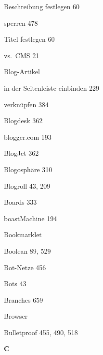 \documentclass{book}
\renewcommand\indexspace{\vspace{11pt}}
\renewcommand\subitem{\par}
\begin{document}
\begin{multicols}{2}
\begin{osp-index}
    \subitem Beschreibung festlegen\hspace{1mm} 60
    \subitem sperren\hspace{1mm} 478
    \subitem Titel festlegen\hspace{1mm} 60
    \subitem vs.\ CMS\hspace{1mm} 21
  \item Blog-Artikel
    \subitem in der Seitenleiste einbinden\hspace{1mm} 229
    \subitem verkn\"upfen\hspace{1mm} 384
  \item Blogdesk\hspace{1mm} 362
  \item blogger.com\hspace{1mm} 193
  \item BlogJet\hspace{1mm} 362
  \item Blogosph\"are\hspace{1mm} 310
  \item Blogroll\hspace{1mm} 43, 209
  \item Boards\hspace{1mm} 333
  \item boastMachine\hspace{1mm} 194
  \item Bookmarklet\hspace{1mm} 
  \item Boolean\hspace{1mm} 89, 529
  \item Bot-Netze\hspace{1mm} 456
  \item Bots\hspace{1mm} 43
  \item Branches\hspace{1mm} 659
  \item Browser\hspace{1mm} 
  \item Bulletproof\hspace{1mm} 455, 490, 518

  \indexspace
{\sffamily\bfseries C}\nopagebreak


\end{osp-index}
\end{multicols}
\end{document}
